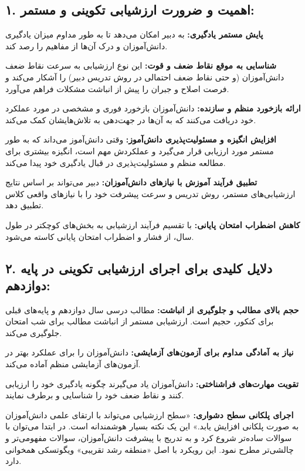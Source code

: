 \documentclass[a4paper,14pt]{article}
\begin{document}
\subsection*{۱. اهمیت و ضرورت ارزشیابی تکوینی و مستمر:}
\textbf{پایش مستمر یادگیری:} به دبیر امکان می‌دهد تا به طور مداوم میزان یادگیری دانش‌آموزان و درک آن‌ها از مفاهیم را رصد کند.

\textbf{شناسایی به موقع نقاط ضعف و قوت:} این نوع ارزشیابی به سرعت نقاط ضعف دانش‌آموزان (و حتی نقاط ضعف احتمالی در روش تدریس دبیر) را آشکار می‌کند و فرصت اصلاح و جبران را پیش از انباشت مشکلات فراهم می‌آورد.

\textbf{ارائه بازخورد منظم و سازنده:} دانش‌آموزان بازخورد فوری و مشخصی در مورد عملکرد خود دریافت می‌کنند که به آن‌ها در جهت‌دهی به تلاش‌هایشان کمک می‌کند.

\textbf{افزایش انگیزه و مسئولیت‌پذیری دانش‌آموز:} وقتی دانش‌آموز می‌داند که به طور مستمر مورد ارزیابی قرار می‌گیرد و عملکردش مهم است، انگیزه بیشتری برای مطالعه منظم و مسئولیت‌پذیری در قبال یادگیری خود پیدا می‌کند.

\textbf{تطبیق فرآیند آموزش با نیازهای دانش‌آموزان:} دبیر می‌تواند بر اساس نتایج ارزشیابی‌های مستمر، روش تدریس و سرعت پیشرفت خود را با نیازهای واقعی کلاس تطبیق دهد.

\textbf{کاهش اضطراب امتحان پایانی:} با تقسیم فرآیند ارزشیابی به بخش‌های کوچکتر در طول سال، از فشار و اضطراب امتحان پایانی کاسته می‌شود.
\medskip

\subsection*{۲. دلایل کلیدی برای اجرای ارزشیابی تکوینی در پایه دوازدهم:}
\textbf{حجم بالای مطالب و جلوگیری از انباشت:} مطالب درسی سال دوازدهم و پایه‌های قبلی برای کنکور، حجیم است. ارزشیابی مستمر از انباشت مطالب برای شب امتحان جلوگیری می‌کند.

\textbf{نیاز به آمادگی مداوم برای آزمون‌های آزمایشی:} دانش‌آموزان را برای عملکرد بهتر در آزمون‌های آزمایشی منظم آماده می‌کند.

\textbf{تقویت مهارت‌های فراشناختی:} دانش‌آموزان یاد می‌گیرند چگونه یادگیری خود را ارزیابی کنند و نقاط ضعف خود را شناسایی و برطرف نمایند.

\textbf{اجرای پلکانی سطح دشواری:}  «سطح ارزشیابی می‌تواند با ارتقای علمی دانش‌آموزان به صورت پلکانی افزایش یابد.» این یک نکته بسیار هوشمندانه است. در ابتدا می‌توان با سوالات ساده‌تر شروع کرد و به تدریج با پیشرفت دانش‌آموزان، سوالات مفهومی‌تر و چالشی‌تر مطرح نمود. این رویکرد با اصل «منطقه رشد تقریبی» ویگوتسکی همخوانی دارد.
\medskip
\end{document}
